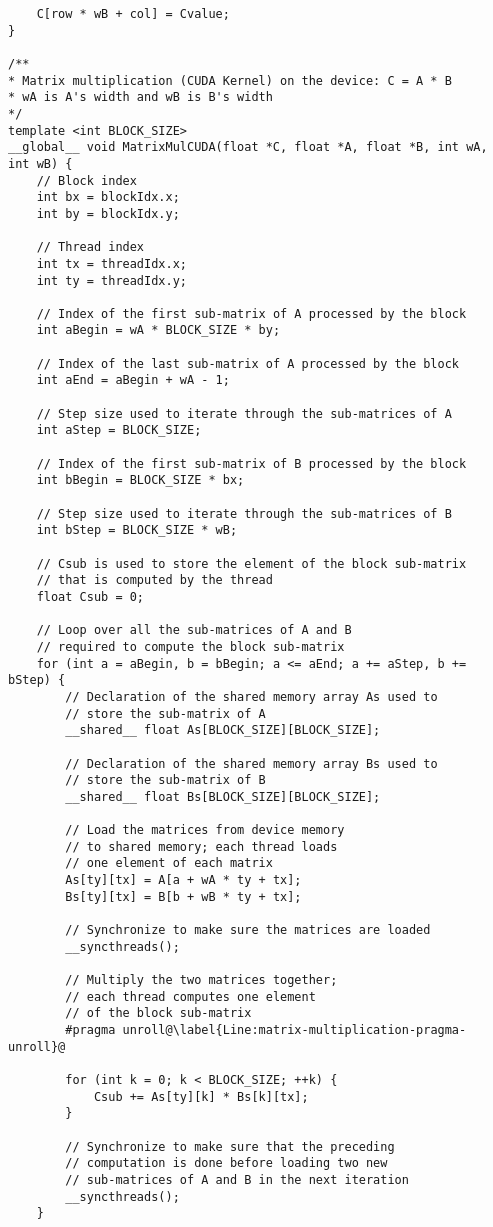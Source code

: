 \begin{lstlisting}
	C[row * wB + col] = Cvalue;
}

/**
* Matrix multiplication (CUDA Kernel) on the device: C = A * B
* wA is A's width and wB is B's width
*/
template <int BLOCK_SIZE>
__global__ void MatrixMulCUDA(float *C, float *A, float *B, int wA, int wB) {
	// Block index
	int bx = blockIdx.x;
	int by = blockIdx.y;
	
	// Thread index
	int tx = threadIdx.x;
	int ty = threadIdx.y;
	
	// Index of the first sub-matrix of A processed by the block
	int aBegin = wA * BLOCK_SIZE * by;
	
	// Index of the last sub-matrix of A processed by the block
	int aEnd = aBegin + wA - 1;
	
	// Step size used to iterate through the sub-matrices of A
	int aStep = BLOCK_SIZE;
	
	// Index of the first sub-matrix of B processed by the block
	int bBegin = BLOCK_SIZE * bx;
	
	// Step size used to iterate through the sub-matrices of B
	int bStep = BLOCK_SIZE * wB;
	
	// Csub is used to store the element of the block sub-matrix
	// that is computed by the thread
	float Csub = 0;
	
	// Loop over all the sub-matrices of A and B
	// required to compute the block sub-matrix
	for (int a = aBegin, b = bBegin; a <= aEnd; a += aStep, b += bStep) {
		// Declaration of the shared memory array As used to
		// store the sub-matrix of A
		__shared__ float As[BLOCK_SIZE][BLOCK_SIZE];
		
		// Declaration of the shared memory array Bs used to
		// store the sub-matrix of B
		__shared__ float Bs[BLOCK_SIZE][BLOCK_SIZE];
		
		// Load the matrices from device memory
		// to shared memory; each thread loads
		// one element of each matrix
		As[ty][tx] = A[a + wA * ty + tx];
		Bs[ty][tx] = B[b + wB * ty + tx];
		
		// Synchronize to make sure the matrices are loaded
		__syncthreads();
		
		// Multiply the two matrices together;
		// each thread computes one element
		// of the block sub-matrix
		#pragma unroll@\label{Line:matrix-multiplication-pragma-unroll}@
		
		for (int k = 0; k < BLOCK_SIZE; ++k) {
			Csub += As[ty][k] * Bs[k][tx];
		}
		
		// Synchronize to make sure that the preceding
		// computation is done before loading two new
		// sub-matrices of A and B in the next iteration
		__syncthreads();
	}
	

\end{lstlisting}
